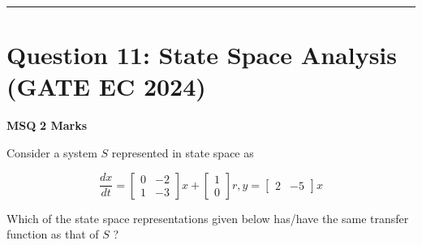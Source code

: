 \documentclass[11pt,a4paper]{article}
\begin{document}
\vspace{1.5em}
\hrule
\vspace{1.5em}

\section*{Question 11: State Space Analysis (GATE EC 2024)}
\noindent \textbf{\color{primary}MSQ} \hfill \textbf{\color{secondary}2 Marks}


\noindent Consider a system $S$ represented in state space as

 
\[
\frac{d x}{d t}=\left[\begin{array}{ll}
0 & -2 \\
1 & -3
\end{array}\right] x+\left[\begin{array}{l}
1 \\
0
\end{array}\right] r, y=\left[\begin{array}{ll}
2 & -5
\end{array}\right] x
\]

Which of the state space representations given below has/have the same transfer function as that of $S$ ?
\end{document}
